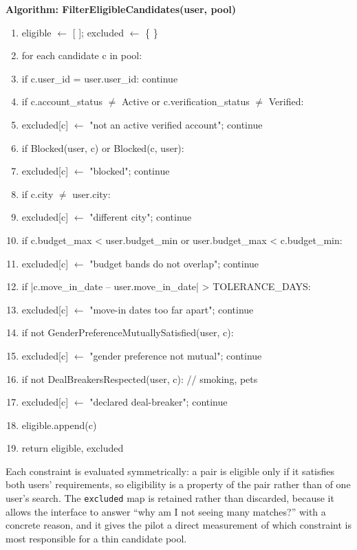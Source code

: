 \documentclass[12pt,a4paper]{report}
\begin{document}
\vspace{3mm}
\textbf{Algorithm: FilterEligibleCandidates(user, pool)}
\begin{enumerate}[label=\arabic*., itemsep=0pt]
    \ttfamily
    \item eligible $\leftarrow$ [ ]; excluded $\leftarrow$ \{ \}
    \item for each candidate c in pool:
    \item \quad if c.user\_id = user.user\_id: continue
    \item \quad if c.account\_status $\neq$ Active or c.verification\_status $\neq$ Verified:
    \item \quad\quad excluded[c] $\leftarrow$ "not an active verified account"; continue
    \item \quad if Blocked(user, c) or Blocked(c, user):
    \item \quad\quad excluded[c] $\leftarrow$ "blocked"; continue
    \item \quad if c.city $\neq$ user.city:
    \item \quad\quad excluded[c] $\leftarrow$ "different city"; continue
    \item \quad if c.budget\_max < user.budget\_min or user.budget\_max < c.budget\_min:
    \item \quad\quad excluded[c] $\leftarrow$ "budget bands do not overlap"; continue
    \item \quad if |c.move\_in\_date -- user.move\_in\_date| > TOLERANCE\_DAYS:
    \item \quad\quad excluded[c] $\leftarrow$ "move-in dates too far apart"; continue
    \item \quad if not GenderPreferenceMutuallySatisfied(user, c):
    \item \quad\quad excluded[c] $\leftarrow$ "gender preference not mutual"; continue
    \item \quad if not DealBreakersRespected(user, c):
    \hfill // smoking, pets
    \item \quad\quad excluded[c] $\leftarrow$ "declared deal-breaker"; continue
    \item \quad eligible.append(c)
    \item return eligible, excluded
\end{enumerate}

\vspace{4mm}

Each constraint is evaluated symmetrically: a pair is eligible only if it satisfies both users' requirements, so eligibility is a property of the pair rather than of one user's search. The \texttt{excluded} map is retained rather than discarded, because it allows the interface to answer ``why am I not seeing many matches?'' with a concrete reason, and it gives the pilot a direct measurement of which constraint is most responsible for a thin candidate pool.
\end{document}
